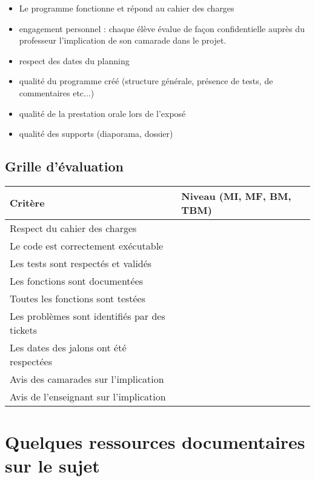 \documentclass[12pt]{article}
\begin{document}
\begin{itemize}
   \item [\textbullet] Le programme fonctionne et répond au cahier des charges
   \item [\textbullet] engagement personnel : chaque élève évalue de façon confidentielle auprès du professeur l'implication de son camarade dans le projet.
  \item [\textbullet] respect des dates du planning
  \item [\textbullet] qualité du programme créé (structure générale, présence de tests, de commentaires etc...)
  \item [\textbullet] qualité de la prestation orale lors de l'exposé
  \item [\textbullet] qualité des supports (diaporama, dossier)

\end{itemize}
\subsection{Grille d'évaluation}

\begin{tabular}{|p{8cm}|p{5cm}|}
  \hline
  Critère & Niveau (MI, MF, BM, TBM) \\ \hline
  Respect du cahier des charges & \\ \hline
  Le code est correctement exécutable & \\ \hline
  Les tests sont respectés et validés & \\ \hline
  Les fonctions sont documentées & \\ \hline
  Toutes les fonctions sont testées & \\ \hline
  Les problèmes sont identifiés par des tickets & \\ \hline
  Les dates des jalons ont été respectées & \\ \hline
  Avis des camarades sur l'implication & \\ \hline
  Avis de l'enseignant sur l'implication & \\ \hline
\end{tabular}

\section{Quelques ressources documentaires sur le sujet}
\end{document}

